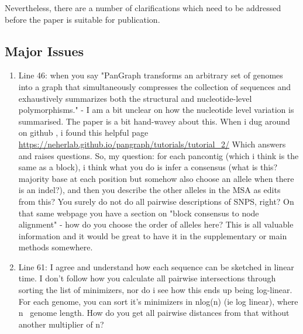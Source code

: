 \documentclass{article}
\begin{document}
Nevertheless, there are a number of clarifications which need to be addressed before the paper is suitable for publication.\\

\subsection*{Major Issues}

\begin{enumerate}
    \item Line 46: when you say "PanGraph transforms an arbitrary set of genomes into a graph that simultaneously compresses the collection of sequences and exhaustively summarizes both the structural and nucleotide-level polymorphisms." - I am a bit unclear on how the nucleotide level variation is summarised. The paper is a bit hand-wavey about this. When i dug around on github , i found this helpful page \url{https://neherlab.github.io/pangraph/tutorials/tutorial_2/} Which answers and raises questions. So, my question: for each pancontig (which i think is the same as a block), i think what you do is infer a consensus (what is this? majority base at each position but somehow also choose an allele when there is an indel?), and then you describe the other alleles in the MSA as edits from this? You surely do not do all pairwise descriptions of SNPS, right? On that same webpage you have a section on "block consensus to node alignment" - how do you choose the order of alleles here? This is all valuable information and it would be great to have it in the supplementary or main methods somewhere.

    \item Line 61: I agree and understand how each sequence can be sketched in linear time. I don't follow how you calculate all pairwise intersections through sorting the list of minimizers, nor do i see how this ends up being log-linear. For each genome, you can sort it's minimizers in nlog(n) (ie log linear), where n ~genome length. How do you get all pairwise distances from that without another multiplier of n?


\end{enumerate}
\end{document}
